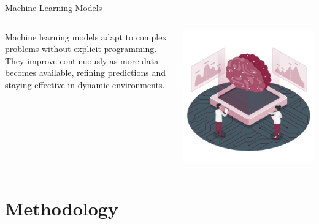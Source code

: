 \documentclass[10pt, xcolor=table]{beamer}
\begin{document}
	
\begin{frame}{Machine Learning Models}
	\begin{columns}[T]
		\begin{column}{0.5\textwidth}
			\justifying
			Machine learning models adapt to complex problems without explicit programming. They improve continuously as more data becomes available, refining predictions and staying effective in dynamic environments.
		\end{column}
		\begin{column}{0.5\textwidth}
			\centering
			\includegraphics[width=\linewidth]{./figures/artificial_intelligence.png}
		\end{column}
	\end{columns}
\end{frame}

	

	
	
\section*{Methodology}
\end{document}
